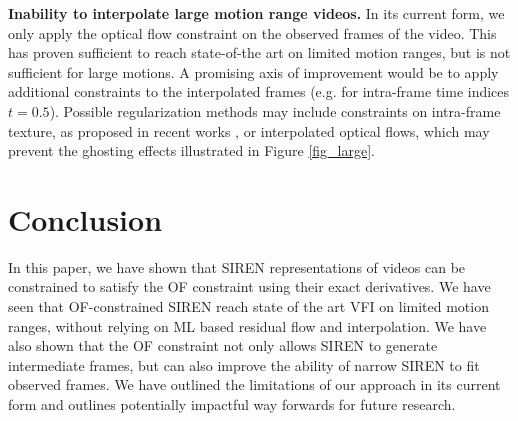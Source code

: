 \documentclass{article}
\begin{document}
\textbf{Inability to interpolate large motion range videos.}
In its current form, we only apply the optical flow constraint on the observed frames of the video.
This has proven sufficient to reach state-of-the art on limited motion ranges, but is not sufficient for large motions.
A promising axis of improvement would be to apply additional constraints to the interpolated frames
(e.g. for intra-frame time indices $t=0.5$).
Possible regularization methods may include constraints on intra-frame texture, as proposed in recent works \cite{reda2022film},
or interpolated optical flows, which may prevent the ghosting effects illustrated in Figure \ref{fig_large}.

\section{Conclusion}
\label{sec_conc}

In this paper, we have shown that SIREN representations of videos
can be constrained to satisfy the OF constraint using their exact derivatives.
We have seen that OF-constrained SIREN reach state of the art VFI on limited motion ranges,
without relying on ML based residual flow and interpolation.
We have also shown that the OF constraint not only allows SIREN to generate intermediate frames,
but can also improve the ability of narrow SIREN to fit observed frames.
We have outlined the limitations of our approach in its current form and outlines
potentially impactful way forwards for future research.



\end{document}
